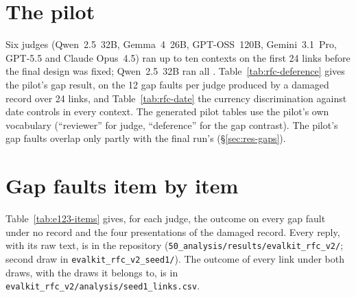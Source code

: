 
\renewcommand{\theHtable}{app\thesection.\arabic{table}}
\renewcommand{\theHfigure}{app\thesection.\arabic{figure}}
\section{The pilot}
\label{app:pilot}
\label{app:study2}
\setcounter{table}{0}\setcounter{figure}{0}

Six judges (Qwen~2.5~32B, Gemma~4~26B, GPT-OSS~120B, Gemini~3.1~Pro, GPT-5.5 and Claude Opus~4.5) ran up to ten
contexts on the first 24 links before the final design was fixed; Qwen~2.5~32B ran all \RfcSample.
Table~\ref{tab:rfc-deference} gives the pilot's gap result, on the 12 gap faults per judge produced by a damaged
record over 24 links, and Table~\ref{tab:rfc-date} the currency discrimination against date controls in every
context. The generated pilot tables use the pilot's own vocabulary (``reviewer'' for judge, ``deference'' for the gap
contrast). The pilot's gap faults overlap only partly with the final run's (\S\ref{sec:res-gaps}).




\section{Gap faults item by item}
\label{app:items}
\setcounter{table}{0}\setcounter{figure}{0}
Table~\ref{tab:e123-items} gives, for each judge, the outcome on every gap fault under no record and the four
presentations of the damaged record. Every reply, with its raw text, is in the repository
(\texttt{50\_analysis/results/evalkit\_rfc\_v2/}; second draw in \texttt{evalkit\_rfc\_v2\_seed1/}). The outcome of every
link under both draws, with the draws it belongs to, is in \texttt{evalkit\_rfc\_v2/\allowbreak analysis/\allowbreak seed1\_links.csv}.


